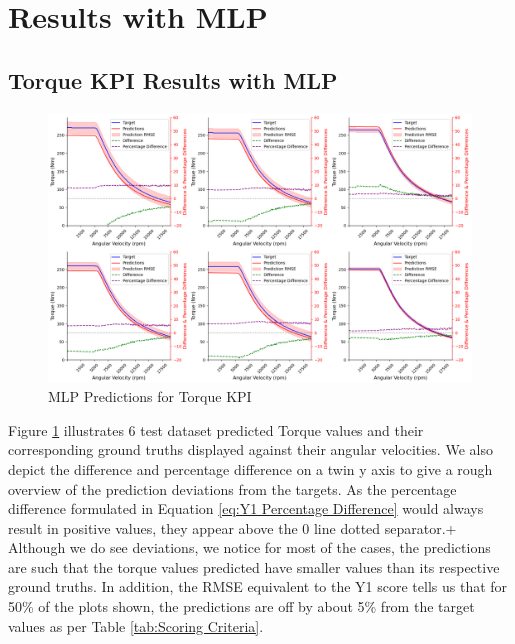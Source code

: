 \documentclass{report} %
\begin{document}
\section{Results with \ac{MLP}}\label{sec:Results with MLP}
\subsection{Torque \ac{KPI} Results with \ac{MLP}}\label{sec:2D Torque Curve Results with MLP}

\begin{figure}[H]
    \centering
    \includegraphics[width=1\textwidth]{./ReportImages/KPI2D_predictions.png} 
    \caption{MLP Predictions for Torque \ac{KPI}} 
    \label{fig:MLP Training Results for 2D KPI(Torque)}
\end{figure}

Figure \ref{fig:MLP Training Results for 2D KPI(Torque)} illustrates 6 test dataset predicted Torque values and their corresponding ground truths displayed against their angular velocities.
We also depict the difference and percentage difference on a twin y axis to give a rough overview of the prediction deviations from the targets.
As the percentage difference formulated in Equation \ref{eq:Y1 Percentage Difference} would always result in positive values, they appear above the 0 line dotted separator.+
Although we do see deviations, we notice for most of the cases, the predictions are such that the torque values predicted have smaller values than its respective ground truths.
In addition, the \ac{RMSE} equivalent to the Y1 score tells us that for 50\% of the plots shown, the predictions are off by about 5\% from the target values as per 
Table \ref{tab:Scoring Criteria}.
\end{document}
